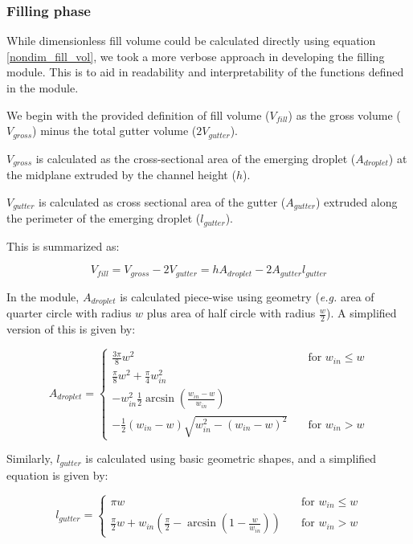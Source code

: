 \subsubsection{Filling phase}

While dimensionless fill volume could be calculated directly using equation \eqref{nondim_fill_vol},
we took a more verbose approach in developing the filling module. This is to aid in readability and
interpretability of the functions defined in the module.

We begin with the provided definition of fill volume ($V_{fill}$) as the gross volume
($V_{gross}$) minus the total gutter volume ($2V_{gutter}$).

$V_{gross}$ is calculated as the cross-sectional area of the emerging droplet ($A_{droplet}$)
at the midplane extruded by the channel height ($h$).

$V_{gutter}$ is calculated as cross sectional area of the gutter ($A_{gutter}$) extruded along
the perimeter of the emerging droplet ($l_{gutter}$).

This is summarized as:

\begin{equation}
  V_{fill} = V_{gross} - 2V_{gutter} = hA_{droplet} - 2A_{gutter}l_{gutter} \label{fill_vol}
\end{equation}

\noindent In the module, $A_{droplet}$ is calculated piece-wise using geometry (\emph{e.g.} area of quarter circle with 
radius $w$ plus area of half circle with radius $\frac{w}{2}$). A simplified version of this is given by:

$$
A_{droplet} = 
    \begin{cases}
      \frac{3\pi}{8}w^2 & \quad \text{for } w_{in} \leq w\\
      \frac{\pi}{8}w^2 + \frac{\pi}{4}w_{in}^2 \\
      - w_{in}^2\frac{1}{2}\arcsin{\left(\frac{w_{in}-w}{w_{in}}\right)} \\
      - \frac{1}{2}\left(w_{in}-w\right)\sqrt{w_{in}^2 - \left(w_{in}-w\right)^2} & \quad \text{for } w_{in} > w
    \end{cases}
$$

\noindent Similarly, $l_{gutter}$ is calculated using basic geometric shapes, and a simplified
equation is given by:

$$
l_{gutter} = 
    \begin{cases}
      {\pi}w & \quad \text{for } w_{in} \leq w\\
      \frac{\pi}{2}w+w_{in}\left(\frac{\pi}{2}-\arcsin\left(1-\frac{w}{w_{in}}\right)\right) & \quad \text{for } w_{in} > w
    \end{cases}
$$


